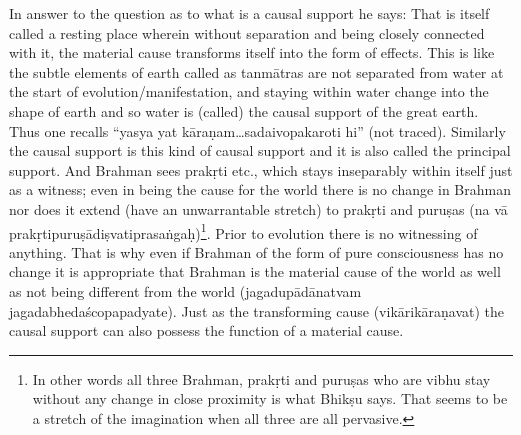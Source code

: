 In answer to the question as to what is a causal support he says: That is itself called a resting place wherein without separation and being closely connected with it, the material cause transforms itself into the form of effects. This is like the subtle elements of earth called as tanmātras are not separated from water at the start of evolution/manifestation, and staying within water change into the shape of earth and so water is (called) the causal support of the great earth. Thus one recalls “yasya yat kāraṇam…sadaivopakaroti hi” (not traced). Similarly the causal support is this kind of causal support and it is also called the principal support. And Brahman sees prakṛti etc., which stays inseparably within itself just as a witness; even in being the cause for the world there is no change in Brahman nor does it extend (have an unwarrantable stretch) to prakṛti and puruṣas (na vā prakṛtipuruṣādiṣvatiprasaṅgaḥ)\footnote{In other words all three Brahman, prakṛti and puruṣas who are vibhu stay without any change in close proximity is what Bhikṣu says. That seems to be a stretch of the imagination when all three are all pervasive.}. Prior to evolution there is no witnessing of anything. That is why even if Brahman of the form of pure consciousness has no change it is appropriate that Brahman is the material cause of the world as well as not being different from the world (jagadupādānatvam jagadabhedaścopapadyate). Just as the transforming cause (vikārikāraṇavat) the causal support can also possess the function of a material cause.  

